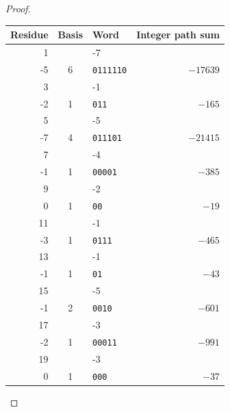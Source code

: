 \begin{proof}
\begin{center}\small\renewcommand{\arraystretch}{1.3}
\begin{longtable}{rclr}\toprule
Residue & Basis & Word & Integer path sum \\ \midrule\endhead
1 & \(\left(\begin{smallmatrix}6&-7\\-5&6\end{smallmatrix}\right)\) & \texttt{0111110} & \(-17639\) \\
3 & \(\left(\begin{smallmatrix}3&-1\\-2&1\end{smallmatrix}\right)\) & \texttt{011} & \(-165\) \\
5 & \(\left(\begin{smallmatrix}9&-5\\-7&4\end{smallmatrix}\right)\) & \texttt{011101} & \(-21415\) \\
7 & \(\left(\begin{smallmatrix}5&-4\\-1&1\end{smallmatrix}\right)\) & \texttt{00001} & \(-385\) \\
9 & \(\left(\begin{smallmatrix}1&-2\\0&1\end{smallmatrix}\right)\) & \texttt{00} & \(-19\) \\
11 & \(\left(\begin{smallmatrix}4&-1\\-3&1\end{smallmatrix}\right)\) & \texttt{0111} & \(-465\) \\
13 & \(\left(\begin{smallmatrix}2&-1\\-1&1\end{smallmatrix}\right)\) & \texttt{01} & \(-43\) \\
15 & \(\left(\begin{smallmatrix}3&-5\\-1&2\end{smallmatrix}\right)\) & \texttt{0010} & \(-601\) \\
17 & \(\left(\begin{smallmatrix}7&-3\\-2&1\end{smallmatrix}\right)\) & \texttt{00011} & \(-991\) \\
19 & \(\left(\begin{smallmatrix}1&-3\\0&1\end{smallmatrix}\right)\) & \texttt{000} & \(-37\) \\

\end{longtable}
\end{center}
\end{proof}
